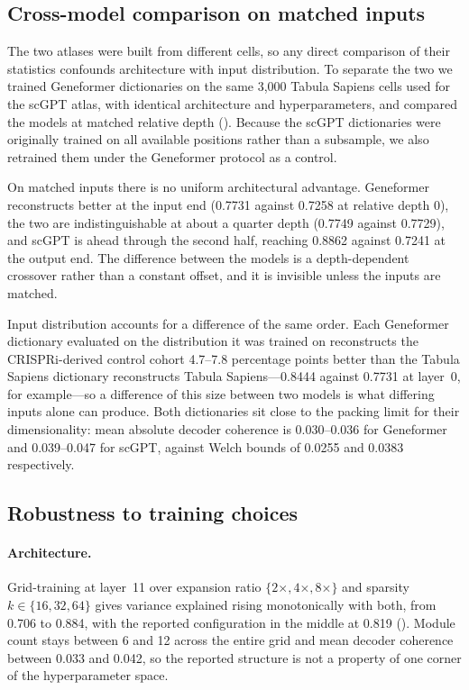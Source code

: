 \subsection*{Cross-model comparison on matched inputs}
\label{sec:crossmodel}

The two atlases were built from different cells, so any direct comparison of their statistics
confounds architecture with input distribution. To separate the two we trained Geneformer
dictionaries on the same 3,000 Tabula Sapiens cells used for the scGPT atlas, with identical
architecture and hyperparameters, and compared the models at matched relative depth
(). Because the scGPT dictionaries were originally trained on all available
positions rather than a subsample, we also retrained them under the Geneformer protocol as a
control.

On matched inputs there is no uniform architectural advantage. Geneformer reconstructs better at
the input end (0.7731 against 0.7258 at relative depth 0), the two are indistinguishable at about a
quarter depth (0.7749 against 0.7729), and scGPT is ahead through the second half, reaching 0.8862
against 0.7241 at the output end. The difference between the models is a depth-dependent crossover
rather than a constant offset, and it is invisible unless the inputs are matched.

Input distribution accounts for a difference of the same order. Each Geneformer dictionary
evaluated on the distribution it was trained on reconstructs the CRISPRi-derived control cohort
4.7--7.8 percentage points better than the Tabula Sapiens dictionary reconstructs Tabula
Sapiens---0.8444 against 0.7731 at layer~0, for example---so a difference of this size between two
models is what differing inputs alone can produce. Both dictionaries sit close to the packing
limit for their dimensionality: mean absolute decoder coherence is 0.030--0.036 for Geneformer and
0.039--0.047 for scGPT, against Welch bounds of 0.0255 and 0.0383 respectively.

\subsection*{Robustness to training choices}
\label{sec:robustness}

\paragraph{Architecture.} Grid-training at layer~11 over expansion ratio $\{2\times, 4\times,
8\times\}$ and sparsity $k \in \{16, 32, 64\}$ gives variance explained rising monotonically with
both, from 0.706 to 0.884, with the reported configuration in the middle at 0.819
(). Module count stays between 6 and 12 across the entire grid and mean decoder
coherence between 0.033 and 0.042, so the reported structure is not a property of one corner of the
hyperparameter space.


